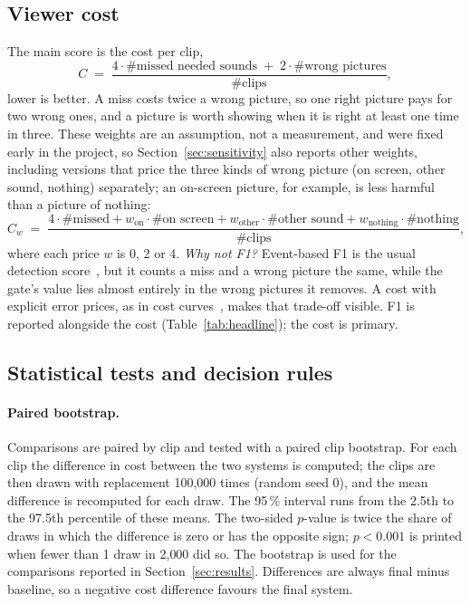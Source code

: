 \subsection{Viewer cost}\label{sec:metric}
The main score is the cost per clip,
\begin{equation}
  C \;=\; \frac{4\cdot\#\text{missed needed sounds} \;+\; 2\cdot\#\text{wrong pictures}}{\#\text{clips}},
  \label{eq:cost}
\end{equation}
lower is better. A miss costs twice a wrong picture, so one right picture pays for two wrong ones, and a picture is
worth showing when it is right at least one time in three. These weights are an assumption, not a measurement, and were fixed early in the
project, so Section~\ref{sec:sensitivity} also reports other weights, including versions that price the three kinds of
wrong picture (on screen, other sound, nothing) separately; an on-screen picture, for example, is less harmful than a
picture of nothing:
\begin{equation}
  C_w \;=\; \frac{4\cdot\#\text{missed} + w_{\text{on}}\cdot\#\text{on screen} + w_{\text{other}}\cdot\#\text{other sound} + w_{\text{nothing}}\cdot\#\text{nothing}}{\#\text{clips}},
  \label{eq:costw}
\end{equation}
where each price $w$ is 0, 2 or 4.
\emph{Why not F1?} Event-based F1 is the usual detection score~\cite{mesaros2016metrics,bilen2020psds}, but it counts a
miss and a wrong picture the same, while the gate's value lies almost entirely in the
wrong pictures it removes. A cost with explicit error prices, as in cost curves~\cite{drummond2006costcurves}, makes that trade-off visible. F1 is
reported alongside the cost (Table~\ref{tab:headline}); the cost is primary.

\subsection{Statistical tests and decision rules}\label{sec:passrules}
\paragraph{Paired bootstrap.} Comparisons are paired by clip and tested with a paired clip bootstrap. For each clip the difference in cost between
the two systems is computed; the clips are then drawn with replacement 100{,}000 times (random seed 0), and the mean
difference is recomputed for each draw. The 95\,\% interval runs from the 2.5th to the 97.5th percentile of these
means. The two-sided $p$-value is twice the share of draws in which the difference is zero or has the opposite sign;
$p < 0.001$ is printed when fewer than 1 draw in 2{,}000 did so.
The bootstrap is used for the comparisons reported in Section~\ref{sec:results}. Differences are always final minus
baseline, so a negative cost difference favours the final system.

